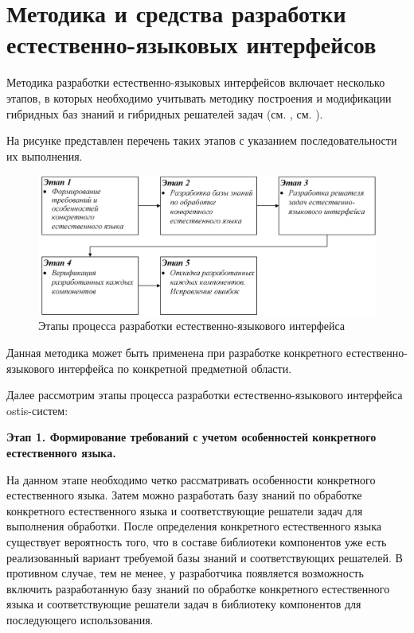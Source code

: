 \section{Методика и средства разработки естественно-языковых интерфейсов}
    
Методика разработки естественно-языковых интерфейсов включает несколько этапов, в которых необходимо учитывать методику построения и модификации гибридных баз знаний и гибридных решателей задач (см. , см. ).

На рисунке \textit{} представлен перечень таких этапов с указанием последовательности их выполнения.
\begin{figure}[H]
	\centering
	\includegraphics[scale=0.8,width=1.0\textwidth]{images/part4/chapter_chinese/method}
	\caption{Этапы процесса разработки естественно-языкового интерфейса}
	\label{fig:method-interface}
\end{figure}

Данная методика может быть применена при разработке конкретного естественно-языкового интерфейса по конкретной предметной области.

Далее рассмотрим этапы процесса разработки естественно-языкового интерфейса ostis-систем:

\textbf{Этап 1. Формирование требований с учетом особенностей конкретного естественного языка.}

На данном этапе необходимо четко рассматривать особенности конкретного естественного языка.
Затем можно разработать базу знаний по обработке конкретного естественного языка и соответствующие решатели задач для выполнения обработки.
После определения конкретного естественного языка существует вероятность того, что в составе библиотеки компонентов уже есть реализованный вариант требуемой базы знаний и соответствующих решателей.
В противном случае, тем не менее, у разработчика появляется возможность включить разработанную базу знаний по обработке конкретного естественного языка и соответствующие решатели задач в библиотеку компонентов для последующего использования.

